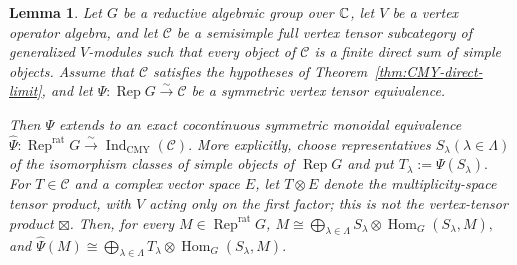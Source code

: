 \documentclass[10pt,a4paper]{amsart}
\numberwithin{equation}{section} \newtheorem{thm}{Theorem}[section] \newtheorem{lem}[thm]{Lemma} \newtheorem{ex}[thm]{Example} \newtheorem{prop}[thm]{Proposition} \newtheorem{cor}[thm]{Corollary} \newtheorem{defi}[thm]{Definition} \newtheorem{rmk}[thm]{Remark} \newtheorem{notation}[thm]{Notation}
\newcommand{\Rep}{\operatorname{Rep}}
\newcommand{\Hom}{\operatorname{Hom}}
\newcommand{\IndCMY}{\operatorname{Ind}_{\mathrm{CMY}}}
\begin{document}
\begin{lem}
\label{lem:ind-equivalence}
Let $G$ be a reductive algebraic group over $\mathbb{C}$, let $V$ be a vertex operator algebra, and let $\mathcal C$ be a semisimple full vertex tensor subcategory of generalized $V$-modules such that every object of $\mathcal C$ is a finite direct sum of simple objects. Assume that $\mathcal C$ satisfies the hypotheses of Theorem~\ref{thm:CMY-direct-limit}, and let \(\Psi:\Rep G\overset{\sim}{\longrightarrow}\mathcal C\) be a symmetric vertex tensor equivalence.

Then $\Psi$ extends to an exact cocontinuous symmetric monoidal equivalence \(\widehat\Psi:\Rep^{\mathrm{rat}}G\overset{\sim}{\longrightarrow}\IndCMY(\mathcal C).\) More explicitly, choose representatives ${S_\lambda}(\lambda\in\Lambda)$ of the isomorphism classes of simple objects of $\Rep G$ and put $ T_\lambda:=\Psi(S_\lambda). $ For $T\in\mathcal C$ and a complex vector space $E$, let $T\otimes E$ denote the multiplicity-space tensor product, with $V$ acting only on the first factor; this is not the vertex-tensor product $\boxtimes$. Then, for every $M\in\Rep^{\mathrm{rat}}G$, \(M\cong\bigoplus_{\lambda\in\Lambda}S_\lambda\otimes\Hom_G(S_\lambda,M),\) and \(\widehat\Psi(M)\cong\bigoplus_{\lambda\in\Lambda}T_\lambda\otimes\Hom_G(S_\lambda,M).\)
\end{lem}
\end{document}

